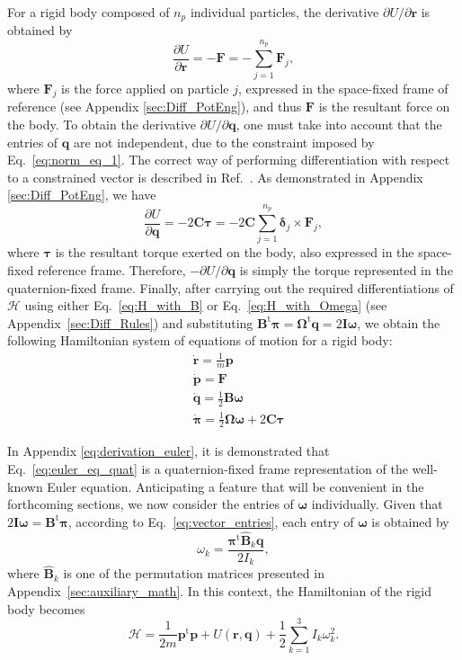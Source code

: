 \documentclass[aip,jcp,reprint,amsmath,amssymb]{revtex4-1}
\newcommand{\mt}[1]{\boldsymbol{\mathbf{#1}}}           %
\newcommand{\vt}[1]{\boldsymbol{\mathbf{#1}}}           %
\newcommand{\tr}[1]{#1^\text{t}}                               %
\newcommand{\diff}[2]{\dfrac{\partial #1}{\partial #2}} %
\begin{document}
For a rigid body composed of $n_p$ individual particles, the derivative $\partial U/\partial \vt r$ is obtained by
\[
\diff{U}{\vt r} = -\vt F = -\sum_{j=1}^{n_p} {\vt F_j},
\]
where $\vt F_j$ is the force applied on particle $j$, expressed in the space-fixed frame of reference (see Appendix \ref{sec:Diff_PotEng}), and thus $\vt F$ is the resultant force on the body. To obtain the derivative $\partial U/\partial \vt q$, one must take into account that the entries of $\vt q$ are not independent, due to the constraint imposed by Eq.~\ref{eq:norm_eq_1}. The correct way of performing differentiation with respect to a constrained vector is described in Ref.~. As demonstrated in Appendix \ref{sec:Diff_PotEng}, we have
\[
\diff{U}{\vt q} = -2 \mt C \vt \tau = -2 \mt C \sum_{j=1}^{n_p} {\vt \delta_j} \times {\vt F_j},
\]
where $\vt \tau$ is the resultant torque exerted on the body, also expressed in the space-fixed reference frame. Therefore, $-\partial U/\partial \vt q$ is simply the torque represented in the quaternion-fixed frame. Finally, after carrying out the required differentiations of $\mathcal{H}$ using either Eq.~\ref{eq:H_with_B} or Eq.~\ref{eq:H_with_Omega} (see Appendix~\ref{sec:Diff_Rules}) and substituting $\tr{\mt B} \vt \pi = \tr{\mt \Omega} \vt q = 2 {\mt I} \vt \omega$, we obtain the following Hamiltonian system of equations of motion for a rigid body:
\begin{subequations}
\label{eq:EDO_system}
\begin{align}
&\dot{\vt r} = \frac{1}{m} \vt p \\
&\dot{\vt p} = \mt F \\
&\dot{\vt q} = \frac{1}{2} \mt B \vt \omega \\
&\dot{\vt \pi} = \frac{1}{2} \mt \Omega \vt \omega + 2 \mt C \vt \tau \label{eq:euler_eq_quat}
\end{align}
\end{subequations}

In Appendix \ref{eq:derivation_euler}, it is demonstrated that Eq.~\ref{eq:euler_eq_quat} is a quaternion-fixed frame representation of the well-known Euler equation.\cite{Goldstein2002} Anticipating a feature that will be convenient in the forthcoming sections, we now consider the entries of $\vt \omega$ individually. Given that $2{\mt I}{\vt \omega} = \tr{\mt B}{\vt \pi}$, according to Eq.~\ref{eq:vector_entries}, each entry of $\vt \omega$ is obtained by
\begin{equation}
\label{eq:omega_entry}
\omega_k = \frac{\tr{\vt \pi} \hat{\mt B}_k \vt q}{2 I_k},
\end{equation}
where $\hat{\mt B}_k$ is one of the permutation matrices presented in Appendix~\ref{sec:auxiliary_math}. In this context, the Hamiltonian of the rigid body becomes
\[
\mathcal{H} = \frac{1}{2m} \tr{\vt p} \vt p + U(\vt r, \vt q) + \frac{1}{2} \sum_{k=1}^3 I_k \omega_k^2.
\]
\end{document}
